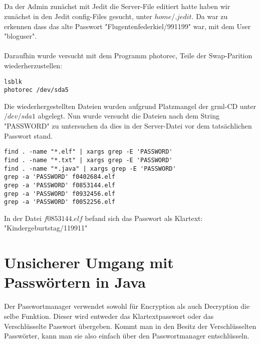 \documentclass[12pt]{article}
\theoremstyle{plain}
\begin{document}
\subsection{}
Da der Admin zunächst mit Jedit die Server-File editiert hatte haben wir zunächst in den Jedit config-Files gesucht, unter $home/.jedit$. Da war zu erkennen dass das alte Passwort "Flugentenfederkiel/991199" war, mit dem User "bloguser". \\ \\ Daraufhin wurde versucht mit dem Programm photorec, Teile der Swap-Parition wiederherzustellen:
\begin{lstlisting}
lsblk
photorec /dev/sda5
\end{lstlisting}
Die wiederhergestellten Dateien wurden aufgrund Platzmangel der grml-CD unter $/dev/sda1$ abgelegt. Nun wurde versucht die Dateien nach dem String "PASSWORD" zu untersuchen da dies in der Server-Datei vor dem tatsächlichen Passwort stand.
\begin{lstlisting}
find . -name "*.elf" | xargs grep -E 'PASSWORD'
find . -name "*.txt" | xargs grep -E 'PASSWORD'
find . -name "*.java" | xargs grep -E 'PASSWORD'
grep -a 'PASSWORD' f0402684.elf
grep -a 'PASSWORD' f0853144.elf
grep -a 'PASSWORD' f0932456.elf
grep -a 'PASSWORD' f0052256.elf
\end{lstlisting}
In der Datei $f0853144.elf$ befand sich das Passwort als Klartext: "Kindergeburtstag/119911"
\section{Unsicherer Umgang mit Passwörtern in Java}
Der Passwortmanager verwendet sowohl für Encryption als auch Decryption die selbe Funktion. Dieser wird entweder das Klartextpasswort oder das Verschlüsselte Passwort übergeben. Kommt man in den Besitz der Verschlüsselten Passwörter, kann man sie also einfach über den Passwortmanager entschlüsseln.
\end{document}
